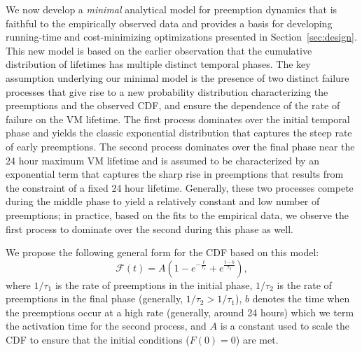 We now develop a \emph{minimal} analytical model for preemption dynamics that is faithful to the empirically observed data and provides a basis for developing running-time and cost-minimizing optimizations presented in Section~\ref{sec:design}.
This new model is based on the earlier observation that the cumulative distribution of lifetimes has multiple distinct temporal phases. The key assumption underlying our minimal model is the presence of two distinct failure processes that give rise to a new probability distribution characterizing the preemptions and the observed CDF, and ensure the dependence of the rate of failure on the VM lifetime. The first process dominates over the initial temporal phase and yields the classic exponential distribution that captures the steep rate of early preemptions. The second process dominates over the final phase near the 24 hour maximum VM lifetime and is assumed to be characterized by an exponential term that captures the sharp rise in preemptions that results from the constraint of a fixed 24 hour lifetime. Generally, these two processes compete during the middle phase to yield a relatively constant and low number of preemptions; in practice, based on the fits to the empirical data, we observe the first process to dominate over the second during this phase as well. 

%
%

We propose the following general form for the CDF based on this model:
\begin{equation}
  \label{eq:blend1}
  \mathscr{F}\left(t\right) = A\left(1-e^{-\frac{t}{\tau_1}} + e^{\frac{t-b}{\tau_2}}\right),
\end{equation}
where $1/\tau_1$ is the rate of preemptions in the initial phase, $1/\tau_2$ is the rate of preemptions in the final phase (generally, $1/\tau_2 > 1/\tau_1$), $b$ denotes the time when the preemptions occur at a high rate (generally, around 24 hours) which we term the activation time for the second process, and $A$ is a constant used to scale the CDF to ensure that the initial conditions ($F(0)=0$) are met.


